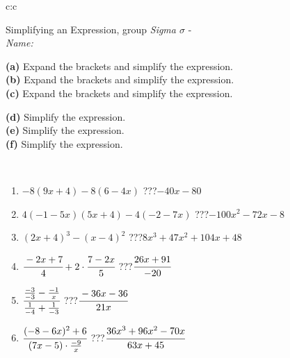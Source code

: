 \documentclass[10pt]{report}
\begin{document}
\newpage
\thispagestyle{empty}
\begin{tabular}{c:c}
\begin{minipage}[c][104.5mm][t]{0.5\linewidth}
\begin{center}
\vspace{7mm}
{\huge Simplifying an Expression, group \textit{Sigma $\sigma$} -}\\[5mm]
\textit{Name:}\phantom{xxxxxxxxxxxxxxxxxxxxxxxxxxxxxxxxxxxxxxxxxxxxxxxxxxxxxxxxxxxxxxxxx}\\[5mm]
\begin{minipage}{0.95\linewidth}
\begin{center}
{\small \begin{minipage}{0.6\textwidth}
\textbf{(a)} Expand the brackets and simplify the expression. \\[1mm]
\textbf{(b)} Expand the brackets and simplify the expression. \\[1mm]
\textbf{(c)} Expand the brackets and simplify the expression.
\end{minipage} \begin{minipage}{0.39\textwidth}
\textbf{(d)} Simplify the expression. \\[1mm]
\textbf{(e)} Simplify the expression. \\[1mm]
\textbf{(f)} Simplify the expression.
\end{minipage}
}
\end{center}
\end{minipage}
\\[4mm]
\begin{minipage}{0.79\linewidth}
\begin{center}
\begin{varwidth}{\linewidth}
\begin{enumerate}
\normalsize
\item $-8(9x+4)-8(6-4x)$\quad \dotfill\; ???\;\dotfill \quad $-40x-80$
\item $4(-1-5x)(5x+4)-4(-2-7x)$\quad \dotfill\; ???\;\dotfill \quad $-100x^2-72x-8$
\item $(2x+4)^3-(x-4)^2$\quad \dotfill\; ???\;\dotfill \quad $8x^3+47x^2+104x+48$
\item $\cfrac{-2x+7}{4}+2\cdot\cfrac{7-2x}{5}$\quad \dotfill\; ???\;\dotfill \quad $\cfrac{26x+91}{-20}$
\item $\cfrac{\frac{-3}{-3}-\frac{-1}{x}}{\frac{1}{-4}+\frac{1}{-3}}$\quad \dotfill\; ???\;\dotfill \quad $\cfrac{-36x-36}{21x}$
\item $\cfrac{(-8-6x)^2+6}{(7x-5)\cdot\frac{-9}{x}}$\quad \dotfill\; ???\;\dotfill \quad $\cfrac{36x^3+96x^2-70x}{63x+45}$

\end{enumerate}
\end{varwidth}
\end{center}
\end{minipage}
\end{center}
\end{minipage}
\end{tabular}
\end{document}
